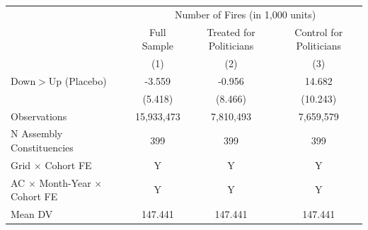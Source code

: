 \begin{tabular}{lccc}
\hline
& \multicolumn{3}{c}{Number of Fires (in 1,000 units)}\\
& Full Sample & Treated for Politicians & Control for Politicians \\
& (1) & (2) & (3) \\
\midrule

Down$>$Up (Placebo)&      -3.559         &      -0.956         &      14.682         \\
            &     (5.418)         &     (8.466)         &    (10.243)         \\
\hline
Observations&  15,933,473         &   7,810,493         &   7,659,579         \\
N Assembly Constituencies&         399         &         399         &         399         \\
Grid $\times$ Cohort FE&           Y         &           Y         &           Y         \\
AC $\times$ Month-Year $\times$ Cohort FE&           Y         &           Y         &           Y         \\
Mean DV     &     147.441         &     147.441         &     147.441         \\
\hline
\end{tabular}
